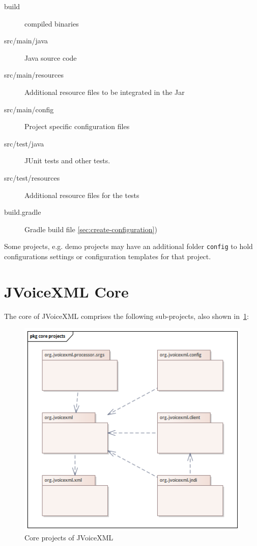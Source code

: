 \documentclass[11pt,a4paper]{article}
\begin{document}
\begin{description}
\item[build] compiled binaries
\item[src/main/java] Java source code
\item[src/main/resources] Additional resource files to be integrated in the Jar
\item[src/main/config] Project specific configuration files
\item[src/test/java] JUnit tests and other tests.
\item[src/test/resources]  Additional resource files for the tests
\item[build.gradle] Gradle build file
\ref{sec:create-configuration})
\end{description}

Some projects, e.g. demo projects may have an additional folder \texttt{config} to hold
configurations settings or configuration templates for that project. 

\section{JVoiceXML Core}
\label{sec:jvoicexml-core}

The core of JVoiceXML comprises the following sub-projects, also shown in~\ref{fig:core-projects}:
\begin{figure}
\includegraphics[width=\linewidth]{core-projects.png}
\caption{Core projects of JVoiceXML}
\label{fig:core-projects}
\end{figure}
\end{document}

